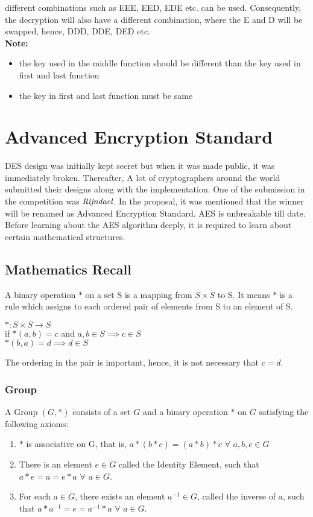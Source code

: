 \documentclass[11pt]{article}
\begin{document}
different combinations such as EEE, EED, EDE etc. can be used. Consequently, the decryption will also have a different combination, where the E and D will be swapped, hence, DDD, DDE, DED etc. \\
\textbf{Note:} 
\begin{itemize}
    \item the key used in the middle function should be different than the key used in first and last function
    \item the key in first and last function must be same
\end{itemize}
\section{Advanced Encryption Standard}
DES design was initially kept secret but when it was made public, it was immediately broken. Thereafter, A lot of cryptographers around the world submitted their designs along with the implementation. One of the submission in the competition was $\emph{Rijndael}$. In the proposal, it was mentioned that the winner will be renamed as Advanced Encryption Standard. AES is unbreakable till date.\\
\vspace{3mm}
Before learning about the AES algorithm deeply, it is required to learn about certain mathematical structures.

\subsection{Mathematics Recall}
A binary operation $*$ on a set S is a mapping from $S \times S$ to S. It means $*$ is a rule which assigns to each ordered pair of elements from S to an element of S.
\begin{center}
    $*: S \times S \rightarrow S$ \\
    \vspace{1mm}
    if $*(a, b) = c$ and $a, b \in S \implies c \in S$\\
    \vspace{1mm}
    $*(b, a) = d \implies d \in S$
\end{center}
The ordering in the pair is important, hence, it is not necessary that $c = d$.

\subsubsection{Group}
A Group $(G, *)$ consists of a set $G$ and a binary operation $*$ on $G$ satisfying the following axioms:
\begin{enumerate}
    \item $*$ is associative on G, that is, $a * (b * c) = (a * b) * c$ $ \forall$ $ a,b,c \in G$
    \item There is an element $e \in G$ called the Identity Element, such that $a * e = a = e * a$ $\forall$ $a \in G$.
    \item For each $a \in G$, there exists an element $a^{-1} \in G$, called the inverse of $a$, such that $a * a^{-1} = e = a^{-1} * a$ $\forall$ $a \in G$. 
\end{enumerate}
\end{document}
